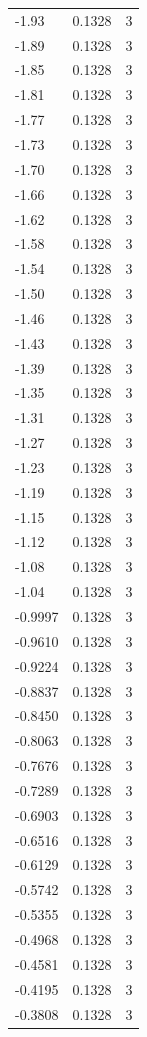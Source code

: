 \begin{longtable}{lrr}
  -1.93 & 0.1328 & 3 \\
  -1.89 & 0.1328 & 3 \\
  -1.85 & 0.1328 & 3 \\
  -1.81 & 0.1328 & 3 \\
  -1.77 & 0.1328 & 3 \\
  -1.73 & 0.1328 & 3 \\
  -1.70 & 0.1328 & 3 \\
  -1.66 & 0.1328 & 3 \\
  -1.62 & 0.1328 & 3 \\
  -1.58 & 0.1328 & 3 \\
  -1.54 & 0.1328 & 3 \\
  -1.50 & 0.1328 & 3 \\
  -1.46 & 0.1328 & 3 \\
  -1.43 & 0.1328 & 3 \\
  -1.39 & 0.1328 & 3 \\
  -1.35 & 0.1328 & 3 \\
  -1.31 & 0.1328 & 3 \\
  -1.27 & 0.1328 & 3 \\
  -1.23 & 0.1328 & 3 \\
  -1.19 & 0.1328 & 3 \\
  -1.15 & 0.1328 & 3 \\
  -1.12 & 0.1328 & 3 \\
  -1.08 & 0.1328 & 3 \\
  -1.04 & 0.1328 & 3 \\
  -0.9997 & 0.1328 & 3 \\
  -0.9610 & 0.1328 & 3 \\
  -0.9224 & 0.1328 & 3 \\
  -0.8837 & 0.1328 & 3 \\
  -0.8450 & 0.1328 & 3 \\
  -0.8063 & 0.1328 & 3 \\
  -0.7676 & 0.1328 & 3 \\
  -0.7289 & 0.1328 & 3 \\
  -0.6903 & 0.1328 & 3 \\
  -0.6516 & 0.1328 & 3 \\
  -0.6129 & 0.1328 & 3 \\
  -0.5742 & 0.1328 & 3 \\
  -0.5355 & 0.1328 & 3 \\
  -0.4968 & 0.1328 & 3 \\
  -0.4581 & 0.1328 & 3 \\
  -0.4195 & 0.1328 & 3 \\
  -0.3808 & 0.1328 & 3 \\

\end{longtable}
